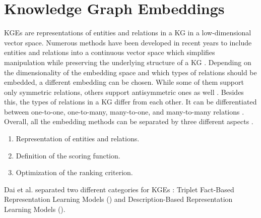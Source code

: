 \section{Knowledge Graph Embeddings} 
\label{sec:knowledge_graph_embeddings}
%
\acfp{KGE} are representations of entities and relations in a \ac{KG} in a low-dimensional vector space. 
Numerous methods have been developed in recent years to include entities and relations into a continuous vector
space which simplifies manipulation while preserving the underlying structure of a KG \cite{8047276}.
Depending on the dimensionality of the embedding space and which types of relations should be embedded, a different embedding can be chosen.
While some of them support only symmetric relations, others support antisymmetric ones as well \cite{8047276}. 
\clearpage
Besides this, the types of relations in a \ac{KG} differ from each other.
It can be differentiated between one-to-one, one-to-many, many-to-one, and many-to-many relations \cite{8047276}.
Overall, all the embedding methods can be separated by three different aspects \cite{electronics9050750}.
\begin{enumerate}
    \item 
    Representation of entities and relations.
    
    \item 
    Definition of the scoring function.
    
    \item 
    Optimization of the ranking criterion.
\end{enumerate}
Dai et al. separated two different categories for \acp{KGE} \cite{electronics9050750}: 
Triplet Fact-Based Representation Learning Models () and Description-Based Representation Learning Models ().








